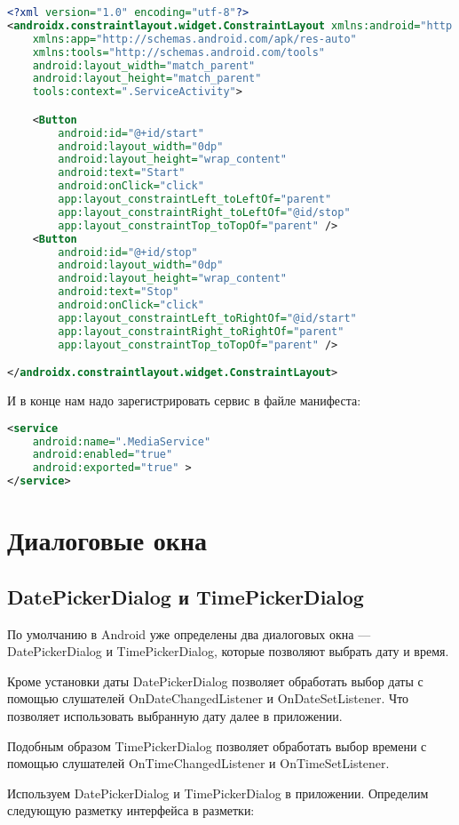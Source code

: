 \begin{lstlisting}[language=XML
	, label=lst:
	]
<?xml version="1.0" encoding="utf-8"?>
<androidx.constraintlayout.widget.ConstraintLayout xmlns:android="http://schemas.android.com/apk/res/android"
    xmlns:app="http://schemas.android.com/apk/res-auto"
    xmlns:tools="http://schemas.android.com/tools"
    android:layout_width="match_parent"
    android:layout_height="match_parent"
    tools:context=".ServiceActivity">

    <Button
        android:id="@+id/start"
        android:layout_width="0dp"
        android:layout_height="wrap_content"
        android:text="Start"
        android:onClick="click"
        app:layout_constraintLeft_toLeftOf="parent"
        app:layout_constraintRight_toLeftOf="@id/stop"
        app:layout_constraintTop_toTopOf="parent" />
    <Button
        android:id="@+id/stop"
        android:layout_width="0dp"
        android:layout_height="wrap_content"
        android:text="Stop"
        android:onClick="click"
        app:layout_constraintLeft_toRightOf="@id/start"
        app:layout_constraintRight_toRightOf="parent"
        app:layout_constraintTop_toTopOf="parent" />

</androidx.constraintlayout.widget.ConstraintLayout>
\end{lstlisting}

И в конце нам надо зарегистрировать сервис в файле манифеста:

\begin{lstlisting}[language=XML
	, label=lst:
	]
<service
	android:name=".MediaService"
	android:enabled="true"
	android:exported="true" >
</service>
\end{lstlisting}

\section{Диалоговые окна}
\subsection{DatePickerDialog и TimePickerDialog}
По умолчанию в Android уже определены два диалоговых окна ---
DatePickerDialog и TimePickerDialog, которые позволяют выбрать дату и
время.\par
Кроме установки даты DatePickerDialog позволяет обработать выбор даты с
помощью слушателей OnDateChangedListener и OnDateSetListener. Что
позволяет использовать выбранную дату далее в приложении.\par
Подобным образом TimePickerDialog позволяет обработать выбор времени с
помощью слушателей OnTimeChangedListener и OnTimeSetListener.\par
Используем DatePickerDialog и TimePickerDialog в приложении. Определим
следующую разметку интерфейса в разметки:

